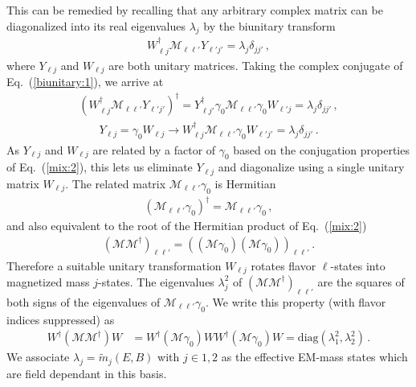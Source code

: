 \documentclass[addchapnum]{ws-rv961x669} %
\newcommand{\req}[1]{Eq.~(\ref{#1})}
\begin{document}
This can be remedied by recalling that any arbitrary complex matrix can be diagonalized into its real eigenvalues $\lambda_{j}$ by the biunitary transform
\begin{align}
\label{biunitary:1}
W_{\ell j}^{\dag}\mathcal{M}_{\ell\ell'}Y_{\ell'j'}=\lambda_{j}\delta_{jj'}\,,
\end{align}
where $Y_{\ell j}$ and $W_{\ell j}$ are both unitary matrices. Taking the complex conjugate of \req{biunitary:1}, we arrive at
\begin{align}
\label{biunitary:2}
(W_{\ell j}^{\dag}\mathcal{M}_{\ell\ell'}Y_{\ell'j'})^{\dag} = 
Y_{\ell j'}^{\dag}\gamma_{0}\mathcal{M}_{\ell\ell'}\gamma_{0}W_{\ell' j}=\lambda_{j}\delta_{jj'}\,,
\end{align}
%
\begin{align}
Y_{\ell j}=\gamma_{0}W_{\ell j}\rightarrow
W_{\ell j}^{\dag}\mathcal{M}_{\ell\ell'}\gamma_{0}W_{\ell'j'}=\lambda_{j}\delta_{jj'}\,. 
\end{align}
As $Y_{\ell j}$ and $W_{\ell j}$ are related by a factor of $\gamma_{0}$ based on the conjugation properties of \req{mix:2}, this lets us eliminate $Y_{\ell j}$ and diagonalize using a single unitary matrix $W_{\ell j}$. The related matrix $\mathcal{M}_{\ell\ell'}\gamma_{0}$ is Hermitian
\begin{align}
\label{herm:1}
(\mathcal{M}_{\ell\ell'}\gamma_{0})^{\dag} = \mathcal{M}_{\ell\ell'}\gamma_{0}\,,
\end{align}
and also equivalent to the root of the Hermitian product of \req{mix:2}
\begin{align}
(\mathcal{M}\mathcal{M}^{\dag})_{\ell\ell'} = \left((\mathcal{M}\gamma_{0})(\mathcal{M}\gamma_{0})\right)_{\ell\ell'}\,.
\end{align}
Therefore a suitable unitary transformation $W_{\ell j}$ rotates flavor $\ell$-states into magnetized mass $j$-states. The eigenvalues $\lambda_{j}^{2}$ of $(\mathcal{M}\mathcal{M}^{\dag})_{\ell\ell'}$ are the squares of both signs of the eigenvalues of $\mathcal{M}_{\ell\ell'}\gamma_{0}$. We write this property (with flavor indices suppressed) as
\begin{align}
W^{\dag}(\mathcal{M}\mathcal{M}^{\dag})W &= W^{\dag}(\mathcal{M}\gamma_{0})WW^{\dag}(\mathcal{M}\gamma_{0})W = \mathrm{diag}(\lambda_{1}^{2},\lambda_{2}^{2})\,.
\end{align}
We associate $\lambda_{j}=\widetilde m_{j}(E,B)$ with $j\in1,2$ as the effective EM-mass states which are field dependant in this basis. 
\end{document}
